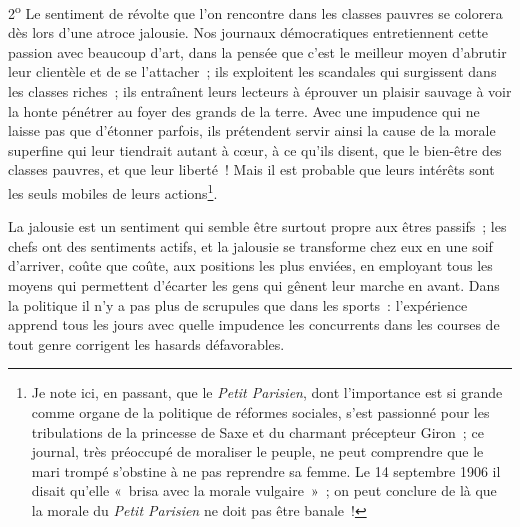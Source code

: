 \documentclass[french,twoside]{book} %
\begin{document}
2\textsuperscript{o} Le sentiment de révolte que l’on rencontre dans les classes pauvres se colorera dès lors d’une atroce jalousie. Nos journaux démocratiques entretiennent cette passion avec beaucoup d’art, dans la pensée que c’est le meilleur moyen d’abrutir leur clientèle et de se l’attacher ; ils exploitent les scandales qui surgissent dans les classes riches ; ils entraînent leurs lecteurs à éprouver un plaisir  sauvage à voir la honte pénétrer au foyer des grands de la terre. Avec une impudence qui ne laisse pas que d’étonner parfois, ils prétendent servir ainsi la cause de la morale superfine qui leur tiendrait autant à cœur, à ce qu’ils disent, que le bien-être des classes pauvres, et que leur liberté ! Mais il est probable que leurs intérêts sont les seuls mobiles de leurs actions\footnote{ \noindent Je note ici, en passant, que le \emph{Petit Parisien}, dont l’importance est si grande comme organe de la politique de réformes sociales, s’est passionné pour les tribulations de la princesse de Saxe et du charmant précepteur Giron ; ce journal, très préoccupé de moraliser le peuple, ne peut comprendre que le mari trompé s’obstine à ne pas reprendre sa femme. Le 14 septembre 1906 il disait qu’elle « brisa avec la morale vulgaire » ; on peut conclure de là que la morale du \emph{Petit Parisien} ne doit pas être banale !
 }.\par
La jalousie est un sentiment qui semble être surtout propre aux êtres passifs ; les chefs ont des sentiments actifs, et la jalousie se transforme chez eux en une soif d’arriver, coûte que coûte, aux positions les plus enviées, en employant tous les moyens qui permettent d’écarter les gens qui gênent leur marche en avant. Dans la politique il n’y a pas plus de scrupules que dans les sports : l’expérience apprend tous les jours avec quelle impudence les concurrents dans les courses de tout genre corrigent les hasards défavorables.\par
\end{document}
